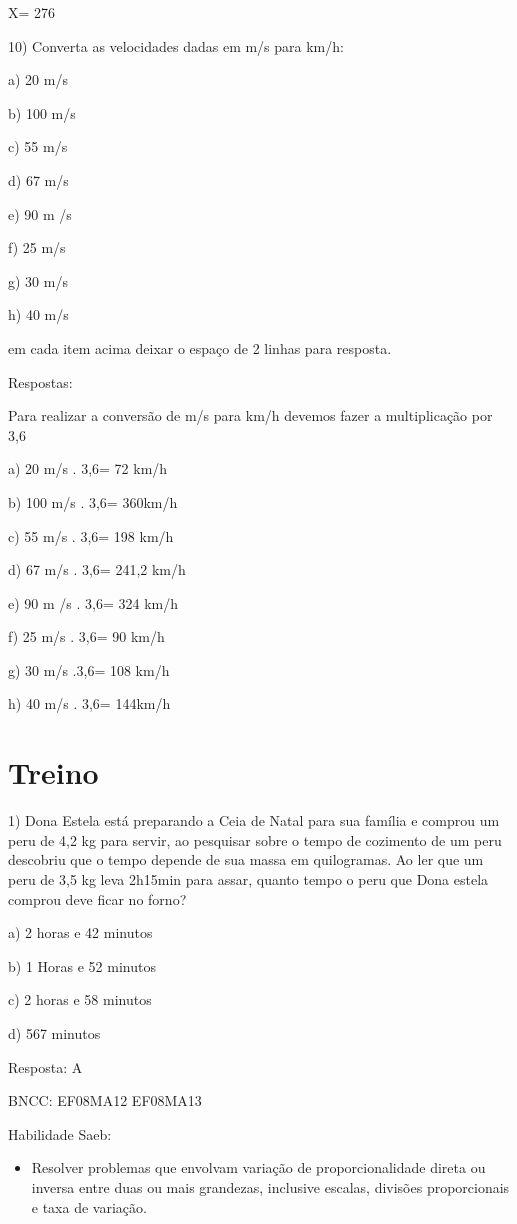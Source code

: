 X= 276

10) Converta as velocidades dadas em m/s para km/h:

a) 20 m/s

b) 100 m/s

c) 55 m/s

d) 67 m/s

e) 90 m /s

f) 25 m/s

g) 30 m/s

h) 40 m/s

em cada item acima deixar o espaço de 2 linhas para resposta.

Respostas:

Para realizar a conversão de m/s para km/h devemos fazer a multiplicação
por 3,6

a) 20 m/s . 3,6= 72 km/h

b) 100 m/s . 3,6= 360km/h

c) 55 m/s . 3,6= 198 km/h

d) 67 m/s . 3,6= 241,2 km/h

e) 90 m /s . 3,6= 324 km/h

f) 25 m/s . 3,6= 90 km/h

g) 30 m/s .3,6= 108 km/h

h) 40 m/s . 3,6= 144km/h

\section{Treino}

1) Dona Estela está preparando a Ceia de Natal para sua família e
comprou um peru de 4,2 kg para servir, ao pesquisar sobre o tempo de
cozimento de um peru descobriu que o tempo depende de sua massa em
quilogramas. Ao ler que um peru de 3,5 kg leva 2h15min para assar,
quanto tempo o peru que Dona estela comprou deve ficar no forno?

a) 2 horas e 42 minutos

b) 1 Horas e 52 minutos

c) 2 horas e 58 minutos

d) 567 minutos

Resposta: A

BNCC: EF08MA12 EF08MA13

Habilidade Saeb:

\begin{itemize}
\tightlist
\item
  Resolver problemas que envolvam variação de proporcionalidade direta
  ou inversa entre duas ou mais grandezas, inclusive escalas, divisões
  proporcionais e taxa de variação.
\end{itemize}

